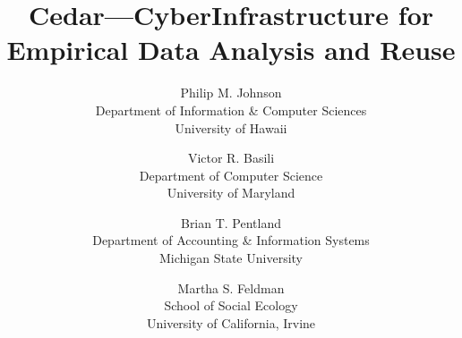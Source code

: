 \documentclass[11pt]{article}
\begin{document}
\title{
Cedar---CyberInfrastructure for Empirical Data Analysis and Reuse}

\medskip

\author{
Philip M. Johnson\\ 
Department of Information \& Computer Sciences\\
University of Hawaii\\
\protect \medskip
\and
Victor R. Basili \\
Department of Computer Science \\
University of Maryland \\
\and
Brian T. Pentland \\
Department of Accounting \& Information Systems\\
Michigan State University \\
\and
Martha S. Feldman \\
School of Social Ecology \\
University of California, Irvine \\
}

\maketitle

\pagestyle{plain}

\tableofcontents
\newpage




%

\newpage



%
%
\end{document}
